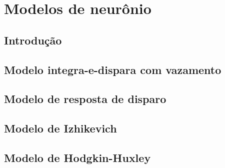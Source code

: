 \chapter{Modelos de neurônio}\label{cap:modelos}
\section{Introdução}\label{sec:modelos_intro}

\section{Modelo integra-e-dispara com vazamento}\label{sec:modelolif}

\section{Modelo de resposta de disparo}\label{sec:srmmodel}

\section{Modelo de Izhikevich}\label{sec:izhikevich}

\section{Modelo de Hodgkin-Huxley}\label{sec:modelohh}
